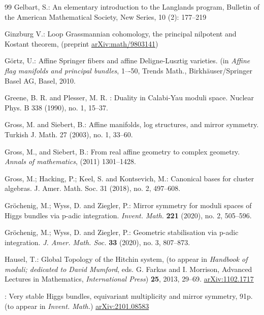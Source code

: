 \begin{thebibliography}{99}
	Gelbart, S.: An elementary introduction to the Langlands program, Bulletin of the American Mathematical Society, New Series, 10 (2): 177--219
	
	 { Ginzburg	V.}: Loop Grassmannian cohomology, the principal nilpotent and Kostant theorem, (preprint \href{https://arxiv.org/abs/math/9803141}{arXiv:math/9803141})
	
	 G\"ortz, U.:
Affine Springer fibers and affine Deligne-Lusztig varieties. (in {\em Affine flag manifolds and principal bundles}, 1–-50,
Trends Math., Birkhäuser/Springer Basel AG, Basel, 2010.
	
	 Greene, B. R. {\rm and} Plesser, M. R. : Duality in Calabi-Yau moduli space.
Nuclear Phys. B 338 (1990), no. 1, 15–37.
	
	Gross, M. {\rm and} Siebert, B.:
Affine manifolds, log structures, and mirror symmetry. Turkish J. Math. 27 (2003), no. 1, 33–60.
	
	 Gross, M., and Siebert, B.:
 From real affine geometry to complex geometry. {\em Annals of mathematics}, (2011) 1301--1428.
	
 Gross, M.; Hacking, P.; Keel, S. {\rm and} Kontsevich, M.:
Canonical bases for cluster algebras.
J. Amer. Math. Soc. 31 (2018), no. 2, 497–608.
	
		{ Gr\"ochenig, M.; Wyss, D. {\rm and} Ziegler, P.}:
	Mirror symmetry for moduli spaces of Higgs bundles via p-adic integration. 
	{\em Invent. Math. }{\bf 221 }(2020), no. 2, 505--596.	
	
		{ Gr\"ochenig, M.; Wyss, D. {\rm and} Ziegler, P.}:
	Geometric stabilisation via p-adic integration.
	{\em	J. Amer. Math. Soc.} {\bf 33 } (2020), no. 3, 807--873.
	
	 { Hausel, T.}: Global Topology of the Hitchin system, (to appear in {\em Handbook of moduli; dedicated to David Mumford}, eds. G. Farkas and I. Morrison, Advanced Lectures in Mathematics, {\em International Press})  {\bf 25}, 2013, {29--69}. \href{https://arxiv.org/abs/1102.1717}{arXiv:1102.1717}
	
	: Very stable Higgs bundles, equivariant multiplicity and mirror symmetry, 91p. (to appear in {\em Invent. Math.})  \href{https://arxiv.org/abs/2101.08583}{arXiv:2101.08583}
	

\end{thebibliography}
